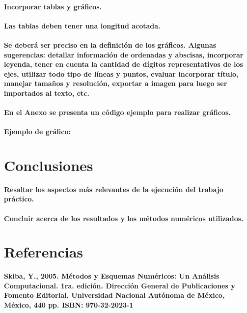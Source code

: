 \documentclass[a4paper,12pt]{article}
\begin{document}
\paragraph{Incorporar tablas y gráficos. }
\paragraph{Las tablas deben tener una longitud acotada.}
\paragraph{Se deberá ser preciso en la definición de los gráficos. Algunas sugerencias: detallar información de ordenadas y abscisas, incorporar leyenda, tener en cuenta la cantidad de dígitos representativos de los ejes, utilizar todo tipo de líneas y puntos, evaluar incorporar título, manejar tamaños y resolución, exportar a imagen para luego ser importados al texto, etc.}
\paragraph{En el Anexo se presenta un código ejemplo para realizar gráficos.}
\paragraph{Ejemplo de gráfico:}

\section{Conclusiones}

\paragraph{Resaltar los aspectos más relevantes de la ejecución del trabajo práctico.}
\paragraph{Concluir acerca de los resultados y los métodos numéricos utilizados.}

\section{Referencias}

\paragraph{Skiba, Y., 2005. Métodos y Esquemas Numéricos: Un Análisis Computacional. 1ra. edición. Dirección General de Publicaciones y Fomento Editorial, Universidad Nacional Autónoma de México, México, 440 pp. ISBN: 970-32-2023-1}
\end{document}
